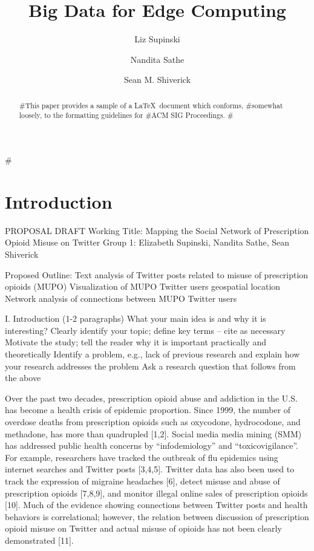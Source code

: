 \documentclass[sigconf]{acmart}
\begin{document}
\title{Big Data for Edge Computing}


\author{Liz Supinski}
\author{Nandita Sathe} 
\author{Sean M. Shiverick}

\renewcommand{\shortauthors}{Supinski, Sathe, Shiverick}


#\begin{abstract}
#This paper provides a sample of a \LaTeX\ document which conforms,
#somewhat loosely, to the formatting guidelines for
#ACM SIG Proceedings.
#\end{abstract}



\maketitle



\section{Introduction}



PROPOSAL DRAFT
Working Title: Mapping the Social Network of Prescription Opioid Misuse on Twitter
Group 1: Elizabeth Supinski, Nandita Sathe, Sean Shiverick

Proposed Outline:
Text analysis of Twitter posts related to misuse of prescription opioids (MUPO)
Visualization of MUPO Twitter users geospatial location
Network analysis of connections between MUPO Twitter users

I. Introduction (1-2 paragraphs) 
What your main idea is and why it is interesting?
Clearly identify your topic; define key terms – cite as necessary
Motivate the study; tell the reader why it is important practically and theoretically
Identify a problem, e.g., lack of previous research and explain how your research addresses the problem
Ask a research question that follows from the above

Over the past two decades, prescription opioid abuse and addiction in the U.S. has become a health crisis of epidemic proportion. Since 1999, the number of overdose deaths from prescription opioids such as oxycodone, hydrocodone, and methadone, has more than quadrupled [1,2]. Social media media mining (SMM) has addressed public health concerns by  “infodemiology” and “toxicovigilance”.  For example, researchers have tracked the outbreak of flu epidemics using internet searches and Twitter posts [3,4,5]. Twitter data has also been used to track the expression of migraine headaches [6], detect misuse and abuse of prescription opioids [7,8,9], and monitor illegal online sales of prescription opioids [10]. Much of the evidence showing connections between Twitter posts and health behaviors is correlational; however, the relation between discussion of prescription opioid misuse on Twitter and actual misuse of opioids has not been clearly demonstrated [11]. 
\end{document}
